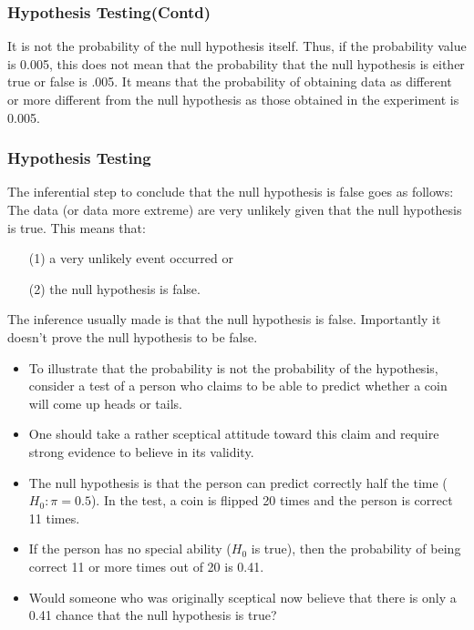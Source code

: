 ﻿\documentclass[a4]{beamer}
\begin{document}
\begin{frame}
\frametitle{Hypothesis Testing(Contd)}

It is not the probability of the null hypothesis itself. Thus, if the probability value is 0.005, this does not mean that the probability that the null hypothesis is either true or false is .005. It means that the probability of obtaining data as different or more different from the null hypothesis as those obtained in the experiment is 0.005.
\end{frame}

\begin{frame}
\frametitle{Hypothesis Testing}
The inferential step to conclude that the null hypothesis is false goes as follows: The data (or data more extreme) are very unlikely given that the null hypothesis is true. 
\bigskip
This means that: 
\begin{itemize}\item [(1)] a very unlikely event occurred or 
\item[(2)] the null hypothesis is false. \end{itemize}

The inference usually made is that the null hypothesis is false. Importantly it doesn’t prove the null hypothesis to be false.
\end{frame}
\begin{frame}
\begin{itemize}
\item To illustrate that the probability is not the probability of the hypothesis, consider a test of a person who claims to be able to predict whether a coin will come up heads or tails. \item One should take a rather sceptical attitude toward this claim and require strong evidence to believe in its validity. \end{itemize}
\end{frame}
\begin{frame}
\begin{itemize}
\item The null hypothesis is that the person can predict correctly half the time ($H_0: \pi = 0.5$). In the test, a coin is flipped 20 times and the person is correct 11 times. \item If the person has no special ability ($H_0$ is true), then the probability of being correct 11 or more times out of 20 is 0.41.\item  Would someone who was originally sceptical now believe that there is only a 0.41 chance that the null hypothesis is true? 
\end{itemize}

\end{frame}
\end{document}
